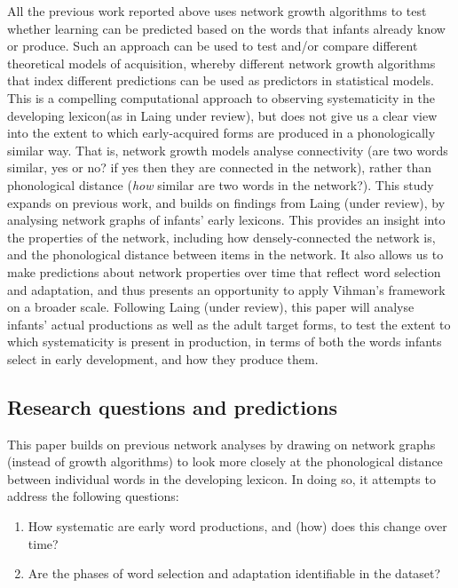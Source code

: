 \documentclass[
  man]{apa6}
\providecommand{\tightlist}{%
  \setlength{\itemsep}{0pt}\setlength{\parskip}{0pt}}
\begin{document}
All the previous work reported above uses network growth algorithms to test whether learning can be predicted based on the words that infants already know or produce. Such an approach can be used to test and/or compare different theoretical models of acquisition, whereby different network growth algorithms that index different predictions can be used as predictors in statistical models. This is a compelling computational approach to observing systematicity in the developing lexicon(as in Laing under review), but does not give us a clear view into the extent to which early-acquired forms are produced in a phonologically similar way. That is, network growth models analyse connectivity (are two words similar, yes or no? if yes then they are connected in the network), rather than phonological distance (\emph{how} similar are two words in the network?). This study expands on previous work, and builds on findings from Laing (under review), by analysing network graphs of infants' early lexicons. This provides an insight into the properties of the network, including how densely-connected the network is, and the phonological distance between items in the network. It also allows us to make predictions about network properties over time that reflect word selection and adaptation, and thus presents an opportunity to apply Vihman's framework on a broader scale. Following Laing (under review), this paper will analyse infants' actual productions as well as the adult target forms, to test the extent to which systematicity is present in production, in terms of both the words infants select in early development, and how they produce them.

\hypertarget{research-questions-and-predictions}{%
\subsection{Research questions and predictions}\label{research-questions-and-predictions}}

This paper builds on previous network analyses by drawing on network graphs (instead of growth algorithms) to look more closely at the phonological distance between individual words in the developing lexicon. In doing so, it attempts to address the following questions:

\begin{enumerate}
\def\labelenumi{\arabic{enumi}.}
\tightlist
\item
  How systematic are early word productions, and (how) does this change over time?
\item
  Are the phases of word selection and adaptation identifiable in the dataset?
\end{enumerate}
\end{document}
